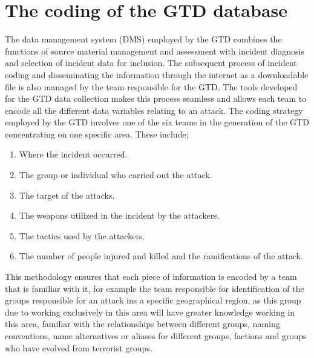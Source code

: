 \section{The coding of the GTD database}
The data management system (DMS) employed by the GTD combines the functions of source material management and assessment with incident diagnosis and selection of incident data for inclusion. The subsequent process of incident coding and disseminating the information through the internet as a downloadable file is also managed by the team responsible for the GTD. The tools developed for the GTD data collection makes this process seamless and allows each team to encode all the different data variables relating to an attack. The coding strategy employed by the GTD involves one of the six teams in the generation of the GTD concentrating on one specific area. These include;
\begin{enumerate}
 \item Where the incident occurred.
 \item  The group or individual who carried out the attack.
 \item The target of the attacks.
 \item The weapons utilized in the incident by the attackers.
 \item The tactics used by the attackers.
 \item The number of people injured and killed and the ramifications of the attack.
 \end{enumerate} 
This methodology ensures that each piece of information is encoded by a team that is familiar with it, for example the team responsible for identification of the groups responsible for an attack ins a specific geographical region,  as this group due to working exclusively in this area will have greater knowledge working in this area, familiar with the relationships between different groups, naming conventions, name alternatives or aliases for different groups, factions and groups who have evolved from terrorist groups.
